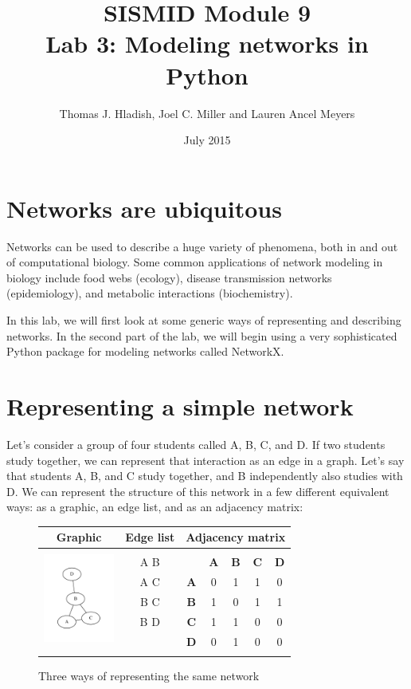 \documentclass{article}
\begin{document}
\title{SISMID Module 9\\Lab 3: Modeling networks in Python}
\author{Thomas J. Hladish, Joel C. Miller and Lauren Ancel Meyers}
\date{July 2015}
\maketitle


\section*{Networks are ubiquitous}
Networks can be used to describe a huge variety of phenomena, both in and out of computational biology.  
Some common applications of network modeling in biology include food webs (ecology), disease transmission networks (epidemiology), 
and metabolic interactions (biochemistry).

In this lab, we will first look at some generic ways of representing and describing networks.  In the second part of the lab, we will
 begin using a very sophisticated Python package for modeling networks called NetworkX.

\section*{Representing a simple network}
Let's consider a group of four students called A, B, C, and D.  If two students study together, we can represent that interaction as an
 edge in a graph.  Let's say that students A, B, and C study together, and B independently also studies with D.  We can represent the 
structure of this network in a few different equivalent ways: as a graphic, an edge list, and as an adjacency matrix:

\UndefineShortVerb{\|}
\begin{figure}[h]
\begin{center}
\begin{tabular}{|c|c|c c c c c|}
\hline
\textbf{Graphic}	&\textbf{Edge list}	&\multicolumn{5}{|c|}{\textbf{Adjacency matrix}}	\\ \hline

\multirow{6}{*}{\includegraphics[trim = .4in .4in .4in .4in, clip, height=1.15in]{7_sampleABC.pdf}} &&&&&& \\
& A B & & \textbf{A} & \textbf{B} & \textbf{C} & \textbf{D} \\
& A C & \textbf{A} & 0 & 1 & 1 & 0\\
& B C & \textbf{B} & 1 & 0 & 1 & 1\\
& B D & \textbf{C} & 1 & 1 & 0 & 0\\
& & \textbf{D} & 0 & 1 & 0 & 0\\
&&&&&&\\
\hline
\end{tabular}
\caption{Three ways of representing the same network}
\end{center}
\end{figure}
\end{document}
